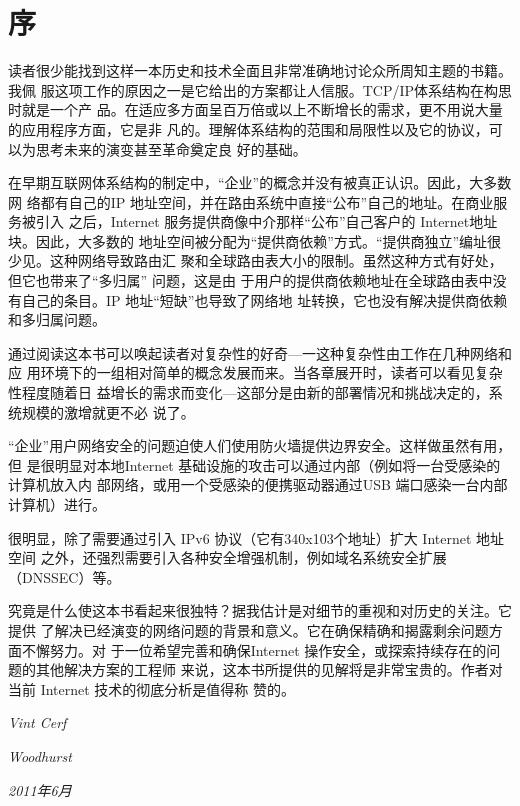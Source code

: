 \chapter*{序}

读者很少能找到这样一本历史和技术全面且非常准确地讨论众所周知主题的书籍。我佩
服这项工作的原因之一是它给出的方案都让人信服。TCP/IP体系结构在构思时就是一个产
品。在适应多方面呈百万倍或以上不断增长的需求，更不用说大量的应用程序方面，它是非
凡的。理解体系结构的范围和局限性以及它的协议，可以为思考未来的演变甚至革命奠定良
好的基础。

在早期互联网体系结构的制定中，“企业”的概念并没有被真正认识。因此，大多数网
络都有自己的IP 地址空间，并在路由系统中直接“公布”自己的地址。在商业服务被引入
之后，Internet 服务提供商像中介那样“公布”自己客户的 Internet地址块。因此，大多数的
地址空间被分配为“提供商依赖”方式。“提供商独立”编址很少见。这种网络导致路由汇
聚和全球路由表大小的限制。虽然这种方式有好处，但它也带来了“多归属” 问题，这是由
于用户的提供商依赖地址在全球路由表中没有自己的条目。IP 地址“短缺”也导致了网络地
址转换，它也没有解决提供商依赖和多归属问题。

通过阅读这本书可以唤起读者对复杂性的好奇—一这种复杂性由工作在几种网络和应
用环境下的一组相对简单的概念发展而来。当各章展开时，读者可以看见复杂性程度随着日
益增长的需求而变化—这部分是由新的部署情况和挑战决定的，系统规模的激增就更不必
说了。

“企业”用户网络安全的问题迫使人们使用防火墙提供边界安全。这样做虽然有用，但
是很明显对本地Internet 基础设施的攻击可以通过内部（例如将一台受感染的计算机放入内
部网络，或用一个受感染的便携驱动器通过USB 端口感染一台内部计算机）进行。

很明显，除了需要通过引入 IPv6 协议（它有340x103个地址）扩大 Internet 地址空间
之外，还强烈需要引入各种安全增强机制，例如域名系统安全扩展（DNSSEC）等。

究竟是什么使这本书看起来很独特？据我估计是对细节的重视和对历史的关注。它提供
了解决已经演变的网络问题的背景和意义。它在确保精确和揭露剩余问题方面不懈努力。对
于一位希望完善和确保Internet 操作安全，或探索持续存在的问题的其他解决方案的工程师
来说，这本书所提供的见解将是非常宝贵的。作者对当前 Internet 技术的彻底分析是值得称
赞的。

\begin{flushright}
    \emph{Vint Cerf}
\end{flushright}

\begin{flushright}
    \emph{Woodhurst}
\end{flushright}

\begin{flushright}
    \emph{2011年6月}
\end{flushright}

